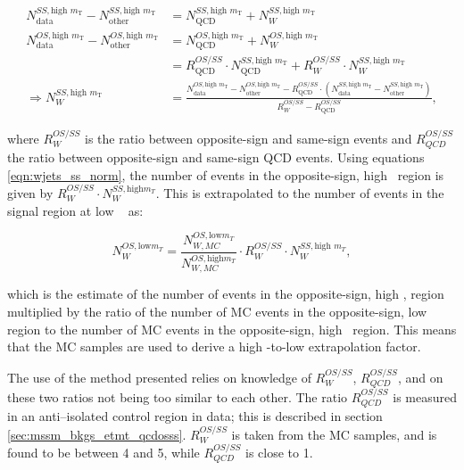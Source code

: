 \begin{equation}\label{eqn:wjets_ss_norm}
\begin{split}
N_{\text{data}}^{SS, \text{high } m_{\text{T}}} - N_{\text{other}}^{SS,
\text{high } m_{\text{T}}} & =
N_{\text{QCD}}^{SS, \text{high } m_{\text{T}}} + N_{W}^{SS, \text{high } m_{\text{T}}} ~\\
N_{\text{data}}^{OS, \text{high } m_{\text{T}}} - N_{\text{other}}^{OS,
\text{high } m_{\text{T}}} & = N_{\text{QCD}}^{OS, \text{high } m_{\text{T}}} +
N_{W}^{OS, \text{high } m_{\text{T}}} \\
& = R_{\text{QCD}}^{OS/SS}\cdot N_{\text{QCD}}^{SS, \text{high } m_{\text{T}}} +
R_{W}^{OS/SS} \cdot N_{W}^{SS, \text{high } m_{\text{T}}} ~\\
\Rightarrow N_{W}^{SS, \text{high } m_{\text{T}}}  &= \frac{N_{\text{data}}^{OS,
\text{high } m_{\text{T}}}  - N_{\text{other}}^{OS, \text{high } m_{\text{T}}}  -
R_{\text{QCD}}^{OS/SS}\cdot(N_{\text{data}}^{SS, \text{high } m_{\text{T}}}  -
N_{\text{other}}^{SS, \text{high } m_{\text{T}}} )}{R_{W}^{OS/SS} -
R_{\text{QCD}}^{OS/SS}} ,
\end{split}
\end{equation}

where $R_{W}^{OS/SS}$ is the ratio between opposite-sign and same-sign \Wjets events
and $R_{QCD}^{OS/SS}$ the ratio between opposite-sign and same-sign QCD events. Using 
equations \ref{eqn:wjets_ss_norm}, the number of \Wjets events in the
opposite-sign, high \mT~region is given by $R_{W}^{OS/SS}\cdot N_{W}^{SS,\text{high} m_{T}}$. 
This is extrapolated to the number of \Wjets events in the signal region at low \mT~ as:

\begin{equation}\label{eqn:wjets_os_norm}
N_{W}^{OS,\text{low} m_{T}} = \frac{N_{W,MC}^{OS,\text{low} m_{T}}}{N_{W,MC}^{OS,\text{high} m_{T}}}\cdot R_{W}^{OS/SS} \cdot N_W^{SS,\text{high }m_{T}},
\end{equation}

which is the estimate of the number of \Wjets events in the opposite-sign, high \mT, region
multiplied by the ratio of the number of \ac{MC} events in the opposite-sign, low \mT~ region to the number of \ac{MC} events in the opposite-sign, high \mT~region. This means that
the \ac{MC} samples are used to derive a high \mT-to-low \mT extrapolation factor.

The use of the method presented relies on knowledge of $R_{W}^{OS/SS}$,
$R_{QCD}^{OS/SS}$, and on these two ratios not being too similar to each other. 
The ratio $R_{QCD}^{OS/SS}$ is measured in an anti--isolated
control region in data; this is described in section \ref{sec:mssm_bkgs_etmt_qcdosss}. $R_{W}^{OS/SS}$ is 
taken from the \Wjets \ac{MC} samples, and is found to be between 4 and 5, while $R_{QCD}^{OS/SS}$
is close to 1.

